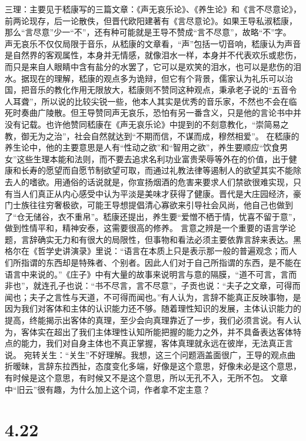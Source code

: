 \documentclass[]{book}
\begin{document}
三理：主要见于嵇康写的三篇文章：《声无哀乐论》、《养生论》和《言不尽意论》，前两论现存，后一论散佚，但晋代欧阳建著有《言尽意论》。如果王导私淑嵇康，那么``言尽意''少一``不''，还有种可能就是王导不赞成``言不尽意''，故略``不''字。
声无哀乐不仅仅局限于音乐，从嵇康的文章看，``声''包括一切音响，嵇康认为声音是自然界的客观属性，本身并无情感，就像泪水一样，本身并不代表欢乐或悲伤，而只是来自人眼睛中含有盐分的水罢了，它可以是欢笑的泪水，也可以是悲伤的泪水。据现在的理解，嵇康的观点多为诡辩，但它有个背景，儒家认为礼乐可以治国，把音乐的教化作用无限放大，嵇康则不赞同这种观点，秉承老子说的``五音令人耳聋''，所以说的比较尖锐一些，他本人其实是优秀的音乐家，不然也不会在临死时奏曲广陵散。但王导赞同声无哀乐，恐怕有另一番含义，只是他的言论书中并没有记载。也许他赞同嵇康在《声无哀乐论》中提到的不刻意教化，``崇简易之教，御无为之治''，社会自然就达到``不期而信，不谋而成，穆然相爱''。
在嵇康的养生论中，他的主要意思是人有``性动之欲''和``智用之欲''，养生要顺应``饮食男女''这些生理本能和法则，而不要去追求名利功业富贵荣辱等外在的价值，出于健康和长寿的愿望而自愿节制欲望可取，而通过礼教法律等遏制人的欲望其实不能除去人的嗜欲。用通俗的话说就是，你宣扬烟酒的危害来要求人们禁欲很难实现，只有当人们真正从内心感受中认为平淡是美味才获得了健康。晋代是大庄园经济，豪门士族往往穷奢极欲，可能王导想提倡清心寡欲来引导社会风尚，他自己也做到了``仓无储谷，衣不重帛''。嵇康还提出，养生要``爱憎不栖于情，忧喜不留于意''，做到性情平和，精神安泰，这需要很高的修养。
言意之辨是一个重要的语言学论题，言辞确实无力和有很大的局限性，但事物和看法必须主要依靠言辞来表达。黑格尔在《哲学史讲演录》里说：``语言在本质上只是表示那一般的普遍观念；而人们所指谓的东西却是特殊者、个别者。因此人们对于自己所指谓的东西，是不能在语言中来说的。''《庄子》中有大量的故事来说明言与意的隔膜，``道不可言，言而非也''，就连孔子也说：``书不尽言，言不尽意''，子贡也说：``夫子之文章，可得而闻也；夫子之言性与天道，不可得而闻也。''有人认为，言辞不能真正反映事物，是因为我们对客体和主体的认识能力还不够。随着理性知识的发展，主体认识能力的提高，终能揭示出客体的真理，至少会向真理靠近了一步，我们必须言说。有人认为，客体实在超出了我们主体理性认知所能把握的能力之外，并不具备表达客体特点的能力，我们对自身主体也不真正掌握，客体真理就永远在彼岸，无法真正言说。
宛转关生：``关生''不好理解。我想，这三个问题涵盖面很广，王导的观点曲折暧昧，言辞东拉西扯，态度变化多端，好像是这个意思，好像未必是这个意思，有时候是这个意思，有时候又不是这个意思，所以无孔不入，无所不包。
文章中``旧云''很有趣，为什么加上这个词，作者拿不定主意？

\section{4.22}\label{section-201}
\end{document}
